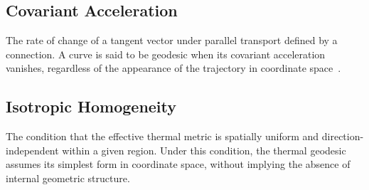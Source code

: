 \documentclass[%
 reprint,
 amsmath,amssymb,
 aps,
 prb,
]{revtex4-2}
\numberwithin{equation}{section}
\begin{document}
\subsection*{Covariant Acceleration}
The rate of change of a tangent vector under parallel transport defined by a connection. A curve is said to be geodesic when its covariant acceleration vanishes, regardless of the appearance of the trajectory in coordinate space~\cite{wald1984}.

\subsection*{Isotropic Homogeneity}
The condition that the effective thermal metric is spatially uniform and direction-independent within a given region. Under this condition, the thermal geodesic assumes its simplest form in coordinate space, without implying the absence of internal geometric structure.


\clearpage



\end{document}
